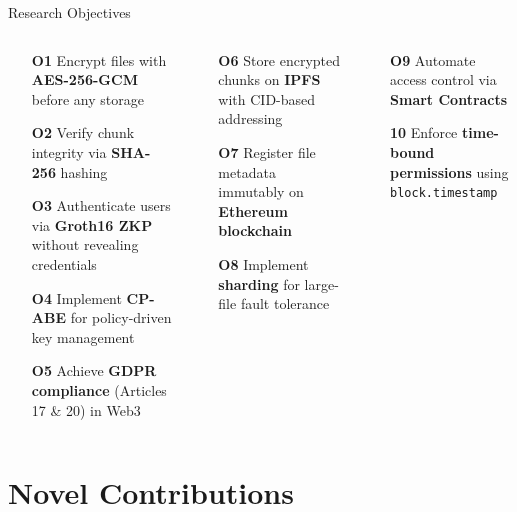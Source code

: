 \documentclass[aspectratio=169]{beamer}
\begin{document}
\begin{frame}{Research Objectives}
\begin{columns}[t]
\begin{tcolorbox}[redbox, title=\textbf{Security Objectives}]
\scriptsize
\begin{itemize}
  \item[\textbf{O1}] Encrypt files with \textbf{AES-256-GCM} before any storage
  \item[\textbf{O2}] Verify chunk integrity via \textbf{SHA-256} hashing
  \item[\textbf{O3}] Authenticate users via \textbf{Groth16 ZKP} without revealing credentials
  \item[\textbf{O4}] Implement \textbf{CP-ABE} for policy-driven key management
  \item[\textbf{O5}] Achieve \textbf{GDPR compliance} (Articles 17 \& 20) in Web3
\end{itemize}
\end{tcolorbox}
\begin{tcolorbox}[bluebox, title=\textbf{Storage Objectives}]
\scriptsize
\begin{itemize}
  \item[\textbf{O6}] Store encrypted chunks on \textbf{IPFS} with CID-based addressing
  \item[\textbf{O7}] Register file metadata immutably on \textbf{Ethereum blockchain}
  \item[\textbf{O8}] Implement \textbf{sharding} for large-file fault tolerance
\end{itemize}
\end{tcolorbox}
\vspace{0.15cm}
\begin{tcolorbox}[greenbox, title=\textbf{Governance Objectives}]
\scriptsize
\begin{itemize}
  \item[\textbf{O9}] Automate access control via \textbf{Smart Contracts}
  \item[\textbf{10}] Enforce \textbf{time-bound permissions} using \texttt{block.timestamp}
\end{itemize}
\end{tcolorbox}
\end{columns}
\end{frame}

\section{Novel Contributions}
\end{document}
